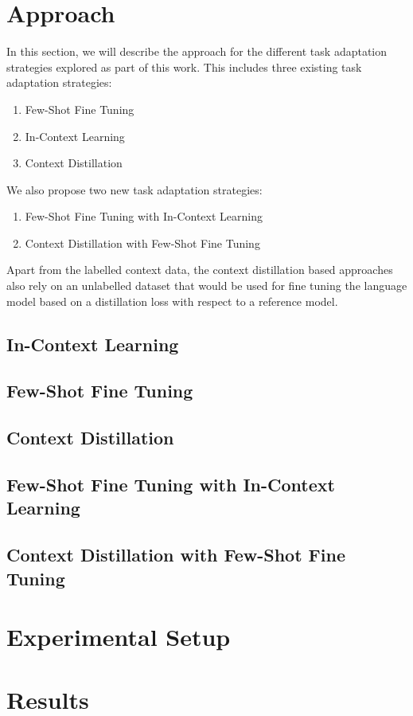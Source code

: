 \documentclass[10pt,twocolumn,letterpaper]{article}
\begin{document}
\section{Approach}
In this section, we will describe the approach for the different task adaptation strategies explored as part of this work. This includes three existing task adaptation strategies:
\begin{enumerate}
    \item Few-Shot Fine Tuning
    \item In-Context Learning
    \item Context Distillation
\end{enumerate}
We also propose two new task adaptation strategies:
\begin{enumerate}
    \item Few-Shot Fine Tuning with In-Context Learning
    \item Context Distillation with Few-Shot Fine Tuning
\end{enumerate}
Apart from the labelled context data, the context distillation based approaches also rely on an unlabelled dataset that would be used for fine tuning the language model based on a distillation loss with respect to a reference model. 
\subsection{In-Context Learning}
\subsection{Few-Shot Fine Tuning}
\subsection{Context Distillation}
\subsection{Few-Shot Fine Tuning with In-Context Learning}
\subsection{Context Distillation with Few-Shot Fine Tuning}

\section{Experimental Setup}
\section{Results}
\end{document}
